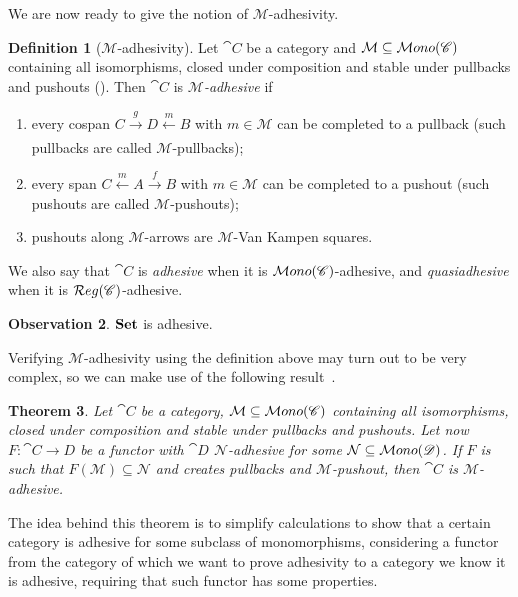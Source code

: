\documentclass[a4paper, twoside,openright]{report}
\theoremstyle{plain}
\newtheorem{theorem}{Theorem}[section]
\theoremstyle{definition}
\newtheorem{definition}[theorem]{Definition}
\newtheorem{obs}[theorem]{Observation}
\begin{document}
We are now ready to give the notion of $\mathcal M$-adhesivity. %

\begin{definition}[$\mathcal{M}$-adhesivity]\label{def:adh}
    Let $\cat C$ be a category and $\mathcal M \subseteq \mathcal{M}ono(\mathscr{C})$ containing all isomorphisms, closed under composition and stable under pullbacks and pushouts ().
    Then $\cat C$ is \emph{$\mathcal M$-adhesive} if
    \begin{enumerate}
        \item every cospan $C \xrightarrow[]{g} D \xleftarrow[]{m} B$ with $m \in \mathcal M$ can be completed to a pullback (such pullbacks are called $\mathcal M$-pullbacks);
        \item every span $C \xleftarrow{m} A \xrightarrow{f} B$ with $ m \in \mathcal M$ can be completed to a pushout (such pushouts are called $\mathcal M$-pushouts);
        \item pushouts along $\mathcal M$-arrows are $\mathcal M$-Van Kampen squares.
    \end{enumerate}
    We also say that $\cat C$ is \emph{adhesive} when it is $\mathcal{M}ono(\mathscr{C})$-adhesive, and \emph{quasiadhesive} when it is $\mathcal{R}eg(\mathscr{C})$-adhesive.
\end{definition}

\begin{obs}
    $\mathbf{Set}$ is adhesive.
\end{obs}

Verifying $\mathcal M$-adhesivity using the definition above may turn out to be very complex, so we can make use of the following result~\cite{castelnovo2022newcriterionmathcalmmathcalnadhesivity}. 

\begin{theorem}\label{th:crit_for_adh}
    Let $\cat C$ be a category, $\mathcal M \subseteq \mathcal{M}ono(\mathscr{C})$ containing all isomorphisms, closed under composition and stable under pullbacks and pushouts. Let now $F: \cat{C \rightarrow D}$ be a functor with $\cat D$ $\mathcal{N}$-adhesive for some $\mathcal{N} \subseteq \mathcal{M}ono(\mathscr{D})$.
    If $F$ is such that $F(\mathcal{M}) \subseteq \mathcal N$ and creates pullbacks and $\mathcal{M}$-pushout, then $\cat C$ is $\mathcal M$-adhesive.
\end{theorem}

The idea behind this theorem is to simplify calculations to show that a certain category is adhesive for some subclass of monomorphisms, considering a functor from the category of which we want to prove adhesivity to a category we know it is adhesive, requiring that such functor has some properties.
\end{document}
